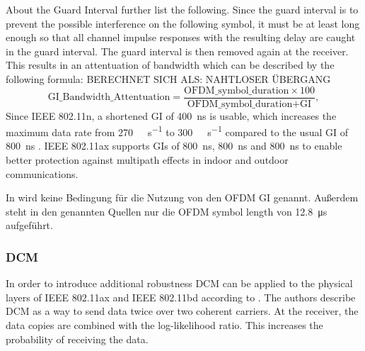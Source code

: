 About the Guard Interval \textcite{pulimamidi_development_2007} further list the following. 
Since the guard interval is to prevent the possible interference on the following symbol, it must be at least long enough so that all channel impulse responses with the resulting delay are caught in the guard interval. 
The guard interval is then removed again at the receiver. This results in an attentuation of bandwidth which can be described by the following formula: BERECHNET SICH ALS: NAHTLOSER ÜBERGANG 
\begin{equation}\label{eq:GI}
	\text{GI\_Bandwidth\_Attentuation} =
	\frac{
		\text{OFDM\_symbol\_duration} \times 100
	}{
		\text{OFDM\_symbol\_duration} + \text{GI}
	}
	,
\end{equation}
Since IEEE 802.11n, a shortened \ac{GI} of \SI{400}{\nano\second} is usable, which increases the maximum data rate from \SI{270}{\mega\bit\per\second} to \SI{300}{\mega\bit\per\second} compared to the usual \ac{GI} of \SI{800}{\nano\second} \cite{sauter_wireless_2022}.  IEEE 802.11ax supports \ac{GI}s of \SI{800}{\nano\second}, \SI{800}{\nano\second} and \SI{800}{\nano\second} to enable better protection against  multipath effects in indoor and outdoor communications. 

In \cite{alleAX} wird keine Bedingung für die Nutzung von den OFDM \ac{GI} genannt. Außerdem steht in den genannten Quellen nur die \ac{OFDM} symbol length von \SI{12.8}{\micro\second} aufgeführt.

\subsubsection*{\acf{DCM}}
In order to introduce additional robustness \ac{DCM} can be applied to the physical layers of IEEE 802.11ax and IEEE 802.11bd according to \textcite{jacob_system-level_2020}. The authors describe \ac{DCM} as a way to send data twice over two coherent carriers. At the receiver, the data copies are combined with the log-likelihood ratio. This increases the probability of receiving the data. 

